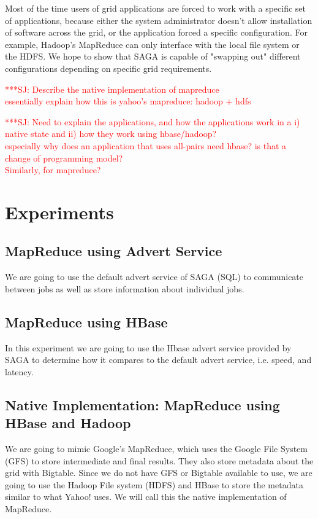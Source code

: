 \documentclass{rspublic}
\newcommand{\jhanote}[1]{ {\textcolor{red} { ***SJ: #1 }}}
\newcommand{\jhanote}[1]{}
\begin{document}
Most of the time users of grid applications are forced to work with a
specific set of applications, because either the system administrator 
doesn't allow installation of software across the grid, or the 
application forced a specific configuration.  For example, Hadoop's 
MapReduce can only interface with the local file system or the HDFS.  
We hope to show that SAGA is capable of "swapping out" different 
configurations depending on specific grid requirements.

\jhanote{Describe the native implementation of mapreduce\\
  essentially explain how this is yahoo's mapreduce: hadoop + hdfs}

\jhanote{Need to explain the applications, and how the applications
  work in a i) native state and ii) how they work using hbase/hadoop? \\
  especially why does an application that uses all-pairs need hbase?
  is that a change of programming model?  \\ Similarly, for
  mapreduce?}


\section*{Experiments}

\subsection*{MapReduce using Advert Service}
We are going to use the default advert service of SAGA (SQL) to 
communicate between jobs as well as store information about 
individual jobs.

\subsection*{MapReduce using HBase}
In this experiment we are going to use the Hbase advert service 
provided by SAGA to determine how it compares to the default advert 
service, i.e. speed, and latency.

\subsection*{Native Implementation: MapReduce using HBase and Hadoop}
We are going to mimic Google's MapReduce, which uses the Google File System (GFS)
to store intermediate and final results.  They also store metadata about the grid 
with Bigtable.  Since we do not have GFS or Bigtable available to use, we are going 
to use the Hadoop File system (HDFS) and HBase to store the metadata similar to 
what Yahoo! uses.  We will call this the native implementation of MapReduce.
\end{document}
